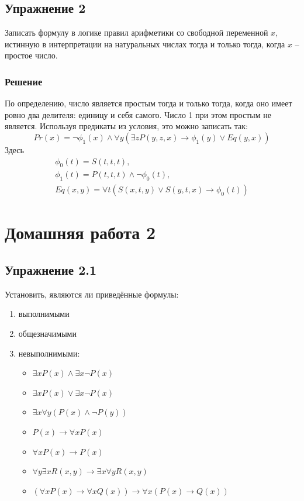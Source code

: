 \documentclass[11pt]{article}
\newcounter{th}\setcounter{th}{0}
\begin{document}
\subsection{Упражнение 2}
\label{sec:orgca7b6be}
Записать формулу в логике правил арифметики со свободной переменной \(x\), истинную в интерпретации на натуральных числах тогда и только тогда, когда \(x\) -- простое число.
\subsubsection{Решение}
\label{sec:orgad4dbf9}
По определению, число является простым тогда и только тогда, когда оно имеет ровно два делителя: единицу и себя самого. Число 1 при этом простым не является. Используя предикаты из условия, это можно записать так:
\begin{equation*}
Pr(x) = \lnot \phi_1(x) \land \forall y (\exists z P(y, z, x) \to \phi_1(y) \lor Eq(y, x))
\end{equation*}
Здесь
\begin{gather*}
\phi_0(t) = S(t, t, t), \\
\phi_1(t) = P(t, t, t) \land \lnot \phi_0(t), \\
Eq(x, y) = \forall t (S(x, t, y) \lor S(y, t, x) \to \phi_0(t))
\end{gather*}
\pagebreak
\section{Домашняя работа 2}
\label{sec:org6436c23}
\subsection{Упражнение 2.1}
\label{sec:org3a2951f}
Установить, являются ли приведённые формулы:
\begin{enumerate}
\item выполнимыми
\item общезначимыми
\item невыполнимыми:
\begin{itemize}
\item \(\exists x P(x) \land \exists x \lnot P(x)\)
\item \(\exists x P(x) \lor \exists x \lnot P(x)\)
\item \(\exists x\forall y(P(x) \land \lnot P(y))\)
\item \(P(x) \to \forall x P(x)\)
\item \(\forall x P(x) \to P(x)\)
\item \(\forall y\exists x R(x, y) \to \exists x\forall y R(x, y)\)
\item \((\forall x P(x) \to \forall x Q(x)) \to \forall x (P(x) \to Q(x))\)
\end{itemize}
\end{enumerate}
\end{document}
